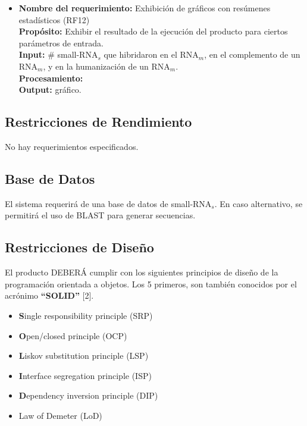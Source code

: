 \documentclass[12pt,a4paper,spanish]{article}
\begin{document}
\begin{itemize}
		\item \textbf{Nombre del requerimiento:} Exhibición de gráficos con resúmenes estadísticos (RF12)\\
 	    \textbf{Propósito:} Exhibir el resultado de la ejecución del producto para ciertos parámetros de entrada. \\
		\textbf{Input:} \# small-RNA$_s$ que hibridaron en el RNA$_m$, en el complemento de un RNA$_m$, y en la humanización de un RNA$_m$. \\
		\textbf{Procesamiento:} \\
		\textbf{Output:} gráfico.\\
	\end{itemize}

\subsection{Restricciones de Rendimiento}
No hay requerimientos especificados.

\subsection{Base de Datos}
	\par El sistema requerirá de una base de datos de small-RNA$_s$. En caso alternativo, se permitirá el uso de BLAST para generar secuencias. 

\subsection{Restricciones de Diseño}
\par El producto DEBERÁ cumplir con los siguientes principios de diseño de la
programación orientada a objetos. Los 5 primeros, son también conocidos por
el acrónimo \textbf{``SOLID''} [2].
\begin{itemize}
	\item \textbf{S}ingle responsibility principle (SRP)
	\item \textbf{O}pen/closed principle (OCP)
	\item \textbf{L}iskov substitution principle (LSP)
	\item \textbf{I}nterface segregation principle (ISP)
	\item \textbf{D}ependency inversion principle (DIP)	
	\item Law of Demeter (LoD)
\end{itemize}
\end{document}

